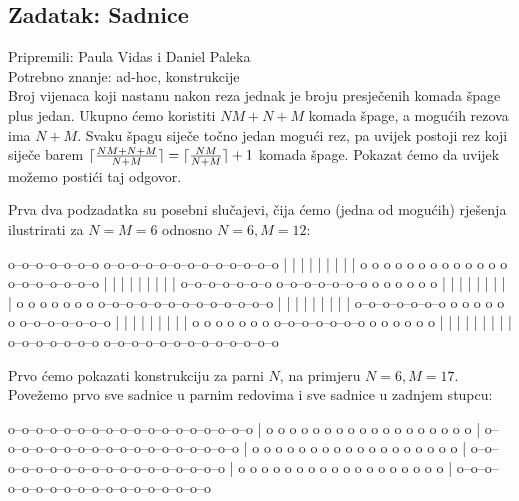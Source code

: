 \subsection*{Zadatak: Sadnice}
\textsf{Pripremili: Paula Vidas i Daniel Paleka}\\
\textsf{Potrebno znanje: ad-hoc, konstrukcije}\\

Broj vijenaca koji nastanu nakon reza jednak je broju presječenih komada špage
plus jedan. Ukupno ćemo koristiti $NM + N + M$ komada špage, a mogućih rezova
ima $N + M$. Svaku špagu siječe točno jedan mogući rez, pa uvijek postoji rez
koji siječe barem $\lceil\frac{NM + N + M}{N + M}\rceil = \lceil\frac{NM}{N + M}\rceil +
1$ komada špage. Pokazat ćemo da uvijek možemo postići taj odgovor.

Prva dva podzadatka su posebni slučajevi, čija ćemo (jedna od mogućih) rješenja
ilustrirati za $N = M = 6$ odnosno $N = 6, M = 12$:

\begin{verbbox}
o--o--o--o--o--o--o              o--o--o--o--o--o--o--o--o--o--o--o--o
|  |  |           |              |  |  |  |        |
o  o  o  o  o  o  o              o  o  o  o  o  o  o--o--o--o--o--o--o
         |  |  |  |                          |  |  |  |  |
o--o--o--o--o--o--o              o--o--o--o--o--o--o  o  o  o  o  o  o
|  |  |           |                                |        |  |  |  |
o  o  o  o  o  o  o              o--o--o--o--o--o--o--o--o--o--o--o--o
         |  |  |  |              |  |  |  |        |
o--o--o--o--o--o--o              o  o  o  o  o  o  o--o--o--o--o--o--o
|  |  |           |                          |  |  |  |  |
o  o  o  o  o  o  o              o--o--o--o--o--o--o  o  o  o  o  o  o
         |  |  |  |                                |        |  |  |  |
o--o--o--o--o--o--o              o--o--o--o--o--o--o--o--o--o--o--o--o
\end{verbbox}
\begin{figure}[H]
  \centering
  \theverbbox
\end{figure}

Prvo ćemo pokazati konstrukciju za parni $N$, na primjeru $N = 6, M = 17$.
Povežemo prvo sve sadnice u parnim redovima i sve sadnice u zadnjem stupcu:
\begin{verbbox}
o--o--o--o--o--o--o--o--o--o--o--o--o--o--o--o--o--o
                                                   |
o  o  o  o  o  o  o  o  o  o  o  o  o  o  o  o  o  o
                                                   |
o--o--o--o--o--o--o--o--o--o--o--o--o--o--o--o--o--o
                                                   |
o  o  o  o  o  o  o  o  o  o  o  o  o  o  o  o  o  o
                                                   |
o--o--o--o--o--o--o--o--o--o--o--o--o--o--o--o--o--o
                                                   |
o  o  o  o  o  o  o  o  o  o  o  o  o  o  o  o  o  o
                                                   |
o--o--o--o--o--o--o--o--o--o--o--o--o--o--o--o--o--o
\end{verbbox}
\begin{figure}[H]
  \centering
  \theverbbox
\end{figure}

